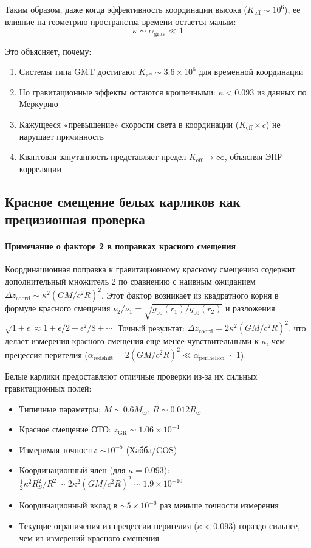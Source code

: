 \documentclass[11pt,a4paper]{article}
\begin{document}
	Таким образом, даже когда эффективность координации высока ($K_{\mathrm{eff}} \sim 10^6$), ее влияние на геометрию пространства-времени остается малым:
	\[
	\kappa \sim \alpha_{\text{grav}} \ll 1
	\]
	
	Это объясняет, почему:
	\begin{enumerate}
		\item Системы типа GMT достигают $K_{\mathrm{eff}} \sim 3.6\times10^6$ для временной координации
		\item Но гравитационные эффекты остаются крошечными: $\kappa < 0.093$ из данных по Меркурию
		\item Кажущееся «превышение» скорости света в координации ($K_{\mathrm{eff}} \times c$) не нарушает причинность
		\item Квантовая запутанность представляет предел $K_{\mathrm{eff}} \to \infty$, объясняя ЭПР-корреляции
	\end{enumerate}	
	\subsection{Красное смещение белых карликов как прецизионная проверка}
	\paragraph{Примечание о факторе 2 в поправках красного смещения}
	Координационная поправка к гравитационному красному смещению содержит дополнительный множитель 2 по сравнению с наивным ожиданием $\Delta z_{\text{coord}} \sim \kappa^2 (GM/c^2R)^2$. Этот фактор возникает из квадратного корня в формуле красного смещения $\nu_2/\nu_1 = \sqrt{g_{00}(r_1)/g_{00}(r_2)}$ и разложения $\sqrt{1 + \epsilon} \approx 1 + \epsilon/2 - \epsilon^2/8 + \cdots$. Точный результат: $\Delta z_{\text{coord}} = 2\kappa^2 (GM/c^2R)^2$, что делает измерения красного смещения еще менее чувствительными к $\kappa$, чем прецессия перигелия ($\alpha_{\text{redshift}} = 2(GM/c^2R)^2 \ll \alpha_{\text{perihelion}} \sim 1$).
	
	Белые карлики предоставляют отличные проверки из-за их сильных гравитационных полей:
	\begin{itemize}
		\item Типичные параметры: $M \sim 0.6 M_\odot$, $R \sim 0.012 R_\odot$
		\item Красное смещение ОТО: $z_{\text{GR}} \sim 1.06\times10^{-4}$
		\item Измеримая точность: $\sim 10^{-5}$ (Хаббл/COS)
		\item Координационный член (для $\kappa = 0.093$): $\frac{1}{2}\kappa^2 R_S^2/R^2 \sim 2\kappa^2 (GM/c^2R)^2 \sim 1.9\times10^{-10}$
		\item Координационный вклад в $\sim 5\times10^{-6}$ раз меньше точности измерения
		\item Текущие ограничения из прецессии перигелия ($\kappa < 0.093$) гораздо сильнее, чем из измерений красного смещения
	\end{itemize}
\end{document}
